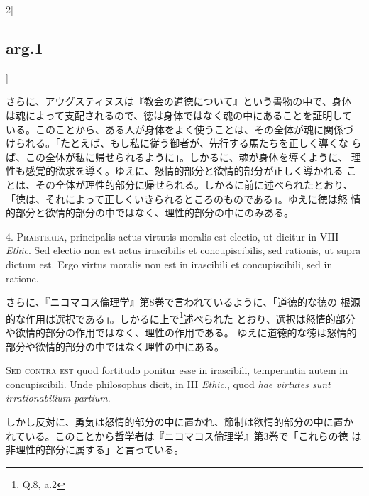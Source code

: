 \documentclass[paper=a4paper,fontsize=10pt,jafontsize=9pt,titlepage]{jlreq}
\begin{document}
\begin{paracol}{2}[\subsection{arg.1}]
\switchcolumn

さらに、アウグスティヌスは『教会の道徳について』という書物の中で、身体
は魂によって支配されるので、徳は身体ではなく魂の中にあることを証明して
いる。このことから、ある人が身体をよく使うことは、その全体が魂に関係づ
けられる。「たとえば、もし私に従う御者が、先行する馬たちを正しく導くな
らば、この全体が私に帰せられるように」。しかるに、魂が身体を導くように、
理性も感覚的欲求を導く。ゆえに、怒情的部分と欲情的部分が正しく導かれる
ことは、その全体が理性的部分に帰せられる。しかるに前に述べられたとおり、
「徳は、それによって正しくいきられるところのものである」。ゆえに徳は怒
情的部分と欲情的部分の中ではなく、理性的部分の中にのみある。


4. {\scshape Praeterea}, principalis actus virtutis moralis est
electio, ut dicitur in VIII {\itshape Ethic}. Sed electio non est
actus irascibilis et concupiscibilis, sed rationis, ut supra dictum
est. Ergo virtus moralis non est in irascibili et concupiscibili, sed
in ratione.

\switchcolumn

さらに、『ニコマコス倫理学』第8巻で言われているように、「道徳的な徳の
根源的な作用は選択である」。しかるに上で\footnote{Q.8, a.2}述べられた
とおり、選択は怒情的部分や欲情的部分の作用ではなく、理性の作用である。
ゆえに道徳的な徳は怒情的部分や欲情的部分の中ではなく理性の中にある。

\switchcolumn*[\subsection{s.c.}]

{\scshape Sed contra est} quod fortitudo ponitur esse in irascibili,
temperantia autem in concupiscibili. Unde philosophus dicit, in III
{\itshape Ethic}., quod {\itshape hae virtutes sunt irrationabilium
partium}.

\switchcolumn

しかし反対に、勇気は怒情的部分の中に置かれ、節制は欲情的部分の中に置か
れている。このことから哲学者は『ニコマコス倫理学』第3巻で「これらの徳
は非理性的部分に属する」と言っている。



\end{paracol}
\end{document}
